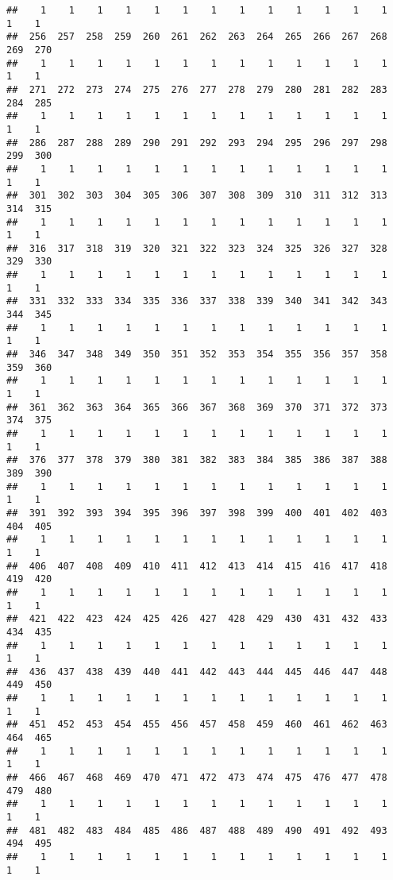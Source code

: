 \documentclass[]{article}
\begin{document}
\begin{verbatim}
##    1    1    1    1    1    1    1    1    1    1    1    1    1    1    1 
##  256  257  258  259  260  261  262  263  264  265  266  267  268  269  270 
##    1    1    1    1    1    1    1    1    1    1    1    1    1    1    1 
##  271  272  273  274  275  276  277  278  279  280  281  282  283  284  285 
##    1    1    1    1    1    1    1    1    1    1    1    1    1    1    1 
##  286  287  288  289  290  291  292  293  294  295  296  297  298  299  300 
##    1    1    1    1    1    1    1    1    1    1    1    1    1    1    1 
##  301  302  303  304  305  306  307  308  309  310  311  312  313  314  315 
##    1    1    1    1    1    1    1    1    1    1    1    1    1    1    1 
##  316  317  318  319  320  321  322  323  324  325  326  327  328  329  330 
##    1    1    1    1    1    1    1    1    1    1    1    1    1    1    1 
##  331  332  333  334  335  336  337  338  339  340  341  342  343  344  345 
##    1    1    1    1    1    1    1    1    1    1    1    1    1    1    1 
##  346  347  348  349  350  351  352  353  354  355  356  357  358  359  360 
##    1    1    1    1    1    1    1    1    1    1    1    1    1    1    1 
##  361  362  363  364  365  366  367  368  369  370  371  372  373  374  375 
##    1    1    1    1    1    1    1    1    1    1    1    1    1    1    1 
##  376  377  378  379  380  381  382  383  384  385  386  387  388  389  390 
##    1    1    1    1    1    1    1    1    1    1    1    1    1    1    1 
##  391  392  393  394  395  396  397  398  399  400  401  402  403  404  405 
##    1    1    1    1    1    1    1    1    1    1    1    1    1    1    1 
##  406  407  408  409  410  411  412  413  414  415  416  417  418  419  420 
##    1    1    1    1    1    1    1    1    1    1    1    1    1    1    1 
##  421  422  423  424  425  426  427  428  429  430  431  432  433  434  435 
##    1    1    1    1    1    1    1    1    1    1    1    1    1    1    1 
##  436  437  438  439  440  441  442  443  444  445  446  447  448  449  450 
##    1    1    1    1    1    1    1    1    1    1    1    1    1    1    1 
##  451  452  453  454  455  456  457  458  459  460  461  462  463  464  465 
##    1    1    1    1    1    1    1    1    1    1    1    1    1    1    1 
##  466  467  468  469  470  471  472  473  474  475  476  477  478  479  480 
##    1    1    1    1    1    1    1    1    1    1    1    1    1    1    1 
##  481  482  483  484  485  486  487  488  489  490  491  492  493  494  495 
##    1    1    1    1    1    1    1    1    1    1    1    1    1    1    1 

\end{verbatim}
\end{document}
